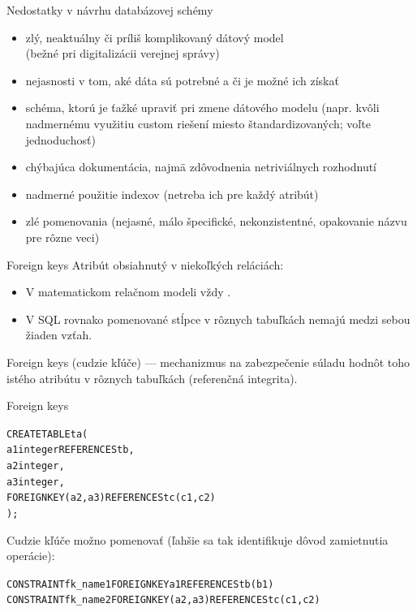 \documentclass[12pt]{beamer}
\begin{document}
\begin{frame}[fragile]{Nedostatky v návrhu databázovej schémy}
\begin{itemize}
\item zlý, neaktuálny či príliš komplikovaný dátový model\\ (bežné pri digitalizácii verejnej správy)
\item nejasnosti v tom, aké dáta sú potrebné a či je možné ich získať
\item schéma, ktorú je ťažké upraviť pri zmene dátového modelu
      (napr. kvôli nadmernému využitiu custom riešení miesto štandardizovaných; voľte jednoduchosť)
\item chýbajúca dokumentácia, najmä zdôvodnenia netriviálnych rozhodnutí
\item nadmerné použitie indexov (netreba ich  pre každý atribút)
\item zlé pomenovania (nejasné, málo špecifické, nekonzistentné, opakovanie názvu pre rôzne veci)
\end{itemize}
\end{frame}


\begin{frame}[fragile]{Foreign keys}
Atribút obsiahnutý v niekoľkých reláciách:
\begin{itemize}
\item V matematickom relačnom modeli vždy .
\item V SQL rovnako pomenované stĺpce v rôznych tabuľkách nemajú medzi sebou žiaden vzťah.
\end{itemize}
\alert{Foreign keys} (cudzie kľúče) --- mechanizmus na zabezpečenie súladu hodnôt toho istého atribútu v rôznych tabuľkách (referenčná integrita).
\end{frame}

\begin{frame}[fragile]{Foreign keys}
\begin{alltt}
CREATE TABLE ta (
  a1 integer \alert{REFERENCES tb},
  a2 integer,
  a3 integer,
  \alert{FOREIGN KEY (a2, a3) REFERENCES tc (c1, c2)}
);
\end{alltt}
Cudzie kľúče možno pomenovať (ľahšie sa tak identifikuje dôvod zamietnutia operácie):
{\scriptsize
\begin{alltt}
  CONSTRAINT fk_name1 FOREIGN KEY a1 REFERENCES tb (b1)
  CONSTRAINT fk_name2 FOREIGN KEY (a2, a3) REFERENCES tc (c1, c2)
\end{alltt}
}
\end{frame}
\end{document}
